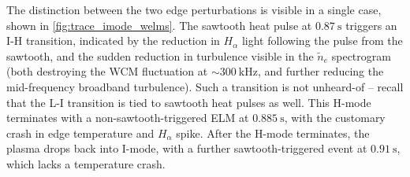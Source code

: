 \begin{figure}[t]
 \pushtooutside
\end{figure}

The distinction between the two edge perturbations is visible in a single case, shown in \cref{fig:trace_imode_welms}.  The sawtooth heat pulse at $\SI{0.87}{\second}$ triggers an I-H transition, indicated by the reduction in $H_\alpha$ light following the pulse from the sawtooth, and the sudden reduction in turbulence visible in the $\tilde{n}_e$ spectrogram (both destroying the WCM fluctuation at $\sim \SI{300}{\kilo\hertz}$, and further reducing the mid-frequency broadband turbulence).  Such a transition is not unheard-of -- recall that the L-I transition is tied to sawtooth heat pulses as well.  This H-mode terminates with a non-sawtooth-triggered ELM at $\SI{0.885}{\second}$, with the customary crash in edge temperature and $H_\alpha$ spike.  After the H-mode terminates, the plasma drops back into I-mode, with a further sawtooth-triggered event at $\SI{0.91}{\second}$, which lacks a temperature crash.

